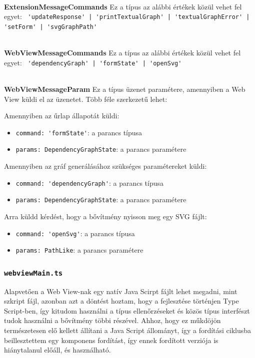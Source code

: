 \\
\vspace{14pt}
\textbf{ExtensionMessageCommands}
Ez a típus az alábbi értékek közül vehet fel egyet: \lstinline{ 'updateResponse' | 'printTextualGraph' | 'textualGraphError' | 'setForm' | 'svgGraphPath'}



\\
\vspace{14pt}
\textbf{WebViewMessageCommands}
Ez a típus az alábbi értékek közül vehet fel egyet: \lstinline{ 'dependencyGraph' | 'formState' | 'openSvg'}




\\
\vspace{14pt}
\textbf{WebViewMessageParam}
Ez a típus üzenet paramétere, amennyiben a Web View küldi el az üzenetet. Több féle szerkezetű lehet:

\noindent Amennyiben az űrlap állapotát küldi:
\begin{itemize}
    \item \lstinline{command: 'formState'}: a parancs típusa
    \item \lstinline{params: DependencyGraphState}: a parancs paramétere
\end{itemize}

\noindent Amennyiben az gráf generálásához szükséges paramétereket küldi:
\begin{itemize}
    \item \lstinline{command: 'dependencyGraph'}: a parancs típusa
    \item \lstinline{params: DependencyGraphState}: a parancs paramétere
\end{itemize}


\noindent Arra küldd kérdést, hogy a bővítmény nyisson meg egy SVG fájlt:
\begin{itemize}
    \item \lstinline{command: 'openSvg'}: a parancs típusa
    \item \lstinline{params: PathLike}: a parancs paramétere
\end{itemize}



\subsubsection{\lstinline{webviewMain.ts}}

Alapvetően a Web View-nak egy natív Java Scirpt fájlt lehet megadni, mint szkript fájl, azonban azt a  döntést hoztam, hogy a fejlesztése történjen Type Script-ben, így kitudom használni a típus ellenőrzéseket és közös típus interfészt tudok használni a bővítmény többi részével. Ahhoz, hogy ez műkdöjön természetesen elő kellett állítani a Java Script állományt, így a fordítási ciklusba beillesztettem egy komponens fordítást, így ennek fordított verziója is hiánytalanul előáll, és használható.

